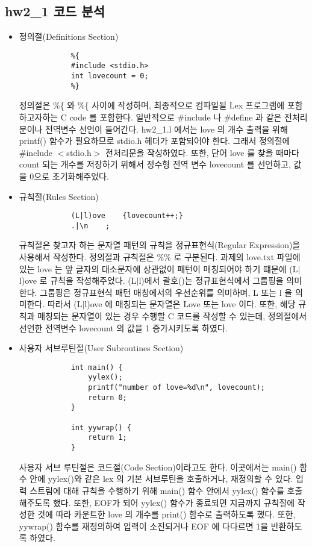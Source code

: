 \documentclass{article}
\begin{document}
\subsection{hw2\_1 코드 분석}
\begin{itemize}
	\item 정의절(Definitions Section)	
		\begin{lstlisting}
			%{
			#include <stdio.h>
			int lovecount = 0;
			%}
		\end{lstlisting}
		정의절은 \%\{ 와 \%\{ 사이에 작성하며,
		최종적으로 컴파일될 Lex 프로그램에 포함하고자하는 C code 를 포함한다.
		일반적으로 \#include 나 \#define 과 같은 전처리문이나 전역변수 선언이 들어간다.
		hw2\_1.l 에서는 love 의 개수 출력을 위해 printf() 함수가 필요하므로 stdio.h
		헤더가 포함되어야 한다. 그래서 정의절에 \#include $<$stdio.h$>$ 전처리문을 작성하였다.
		또한, 단어 love 를 찾을 때마다 count 되는 개수를 저장하기 위해서 정수형 전역 변수
		lovecount 를 선언하고, 값을 0으로 초기화해주었다.
	\item 규칙절(Rules Section)	
		\begin{lstlisting}
			(L|l)ove	{lovecount++;}
			.|\n	;
		\end{lstlisting}
		규칙절은 찾고자 하는 문자열 패턴의 규칙을 정규표현식(Regular Expression)을
		사용해서 작성한다. 정의절과 규칙절은 \%\% 로 구분된다. 과제의 love.txt 파일에 있는
		love 는 앞 글자의 대소문자에 상관없이 패턴이 매칭되어야 하기 떄문에 (L$|$l)ove 로
		규칙을 작성해주었다. (L$|$l)에서 괄호()는 정규표현식에서 그룹핑을 의미한다. 그룹핑은
		정규표현식 패턴 매칭에서의 우선순위를 의미하며, L 또는 l 을 의미한다. 따라서 (L$|$l)ove
		에 매칭되는 문자열은 Love 또는 love 이다. 또한, 해당 규칙과 매칭되는 문자열이 있는 경우
		수행할 C 코드를 작성할 수 있는데, 정의절에서 선언한 전역변수 lovecount 의 값을 1
		증가시키도록 하였다.
	\item 사용자 서브루틴절(User Subroutines Section)	
		\begin{lstlisting}
			int main() {
				yylex();
				printf("number of love=%d\n", lovecount);
				return 0;
			}

			int yywrap() {
				return 1;
			}
		\end{lstlisting}
		사용자 서브 루틴절은 코드절(Code Section)이라고도 한다. 이곳에서는 main()
		함수 안에 yylex()와 같은 lex 의 기본 서브루틴을 호출하거나, 재정의할 수 있다.
		입력 스트림에 대해 규칙을 수행하기 위해 main() 함수 안에서 yylex() 함수를
		호출해주도록 했다. 또한, EOF가 되어 yylex() 함수가 종료되면 지금까지 규칙절에
		작성한 것에 따라 카운트한 love 의 개수를 print() 함수로 출력하도록 했다.
		또한, yywrap() 함수를 재정의하여 입력이 소진되거나 EOF 에 다다르면 1을
		반환하도록 하였다.
\end{itemize}
\end{document}
